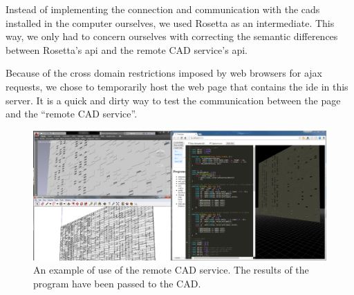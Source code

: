 Instead of implementing the connection and communication with the \glspl{cad} installed in the computer ourselves, we used Rosetta as an intermediate.
This way, we only had to concern ourselves with correcting the semantic differences between Rosetta's \gls{api} and the remote CAD service's \gls{api}.

Because of the cross domain restrictions imposed by web browsers for \gls{ajax} requests, we chose to temporarily host the web page that contains the \gls{ide} in this server.
It is a quick and dirty way to test the communication between the page and the ``remote CAD service''.

\begin{figure}
  \centering
  \includegraphics[width=1.0\textwidth]{./images/remote_cad_example}
  \caption[An example of use of the remote CAD service.]{An example of use of the remote CAD service. The results of the program have been passed to the CAD.}
  \label{fig:remote:cad:example}
\end{figure}






